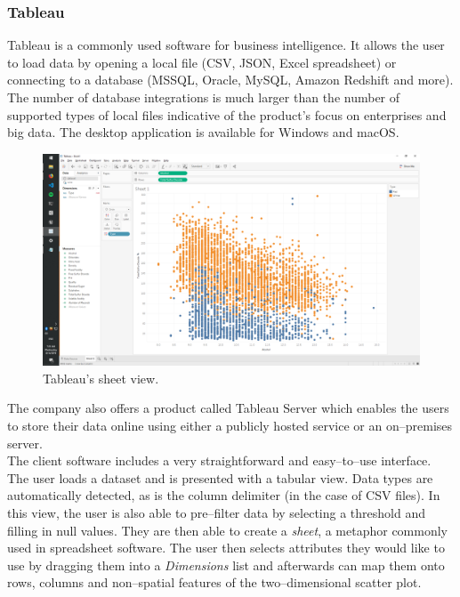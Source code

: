 \documentclass{article}
\begin{document}
\subsubsection{Tableau}

Tableau is a commonly used software for business intelligence. It allows the user to load data by opening a local file (CSV, JSON, Excel spreadsheet) or connecting to a database (MSSQL, Oracle, MySQL, Amazon Redshift and more). The number of database integrations is much larger than the number of supported types of local files indicative of the product's focus on enterprises and big data. The desktop application is available for Windows and macOS.\cite{tableau}\\

\begin{figure}[!h]
\centering
\includegraphics[scale=0.25]{images/tableau_sheet}
\caption{Tableau's sheet view.}
\label{fig:tableausheet}
\end{figure}

The company also offers a product called Tableau Server which enables the users to store their data online using either a publicly hosted service or an on--premises server.\\

The client software includes a very straightforward and easy--to--use interface. The user loads a dataset and is presented with a tabular view. Data types are automatically detected, as is the column delimiter (in the case of CSV files). In this view, the user is also able to pre--filter data by selecting a threshold and filling in null values. They are then able to create a \emph{sheet}, a metaphor commonly used in spreadsheet software. The user then selects attributes they would like to use by dragging them into a \emph{Dimensions} list and afterwards can map them onto rows, columns and non--spatial features of the two--dimensional scatter plot.\\
\end{document}
